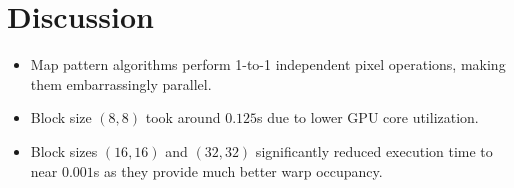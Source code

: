 \documentclass{article}
\begin{document}
\section{Discussion}
\begin{itemize}
    \item Map pattern algorithms perform 1-to-1 independent pixel operations, making them embarrassingly parallel.
    \item Block size $(8, 8)$ took around $0.125$s due to lower GPU core utilization.
    \item Block sizes $(16, 16)$ and $(32, 32)$ significantly reduced execution time to near $0.001$s as they provide much better warp occupancy.
\end{itemize}
\end{document}
